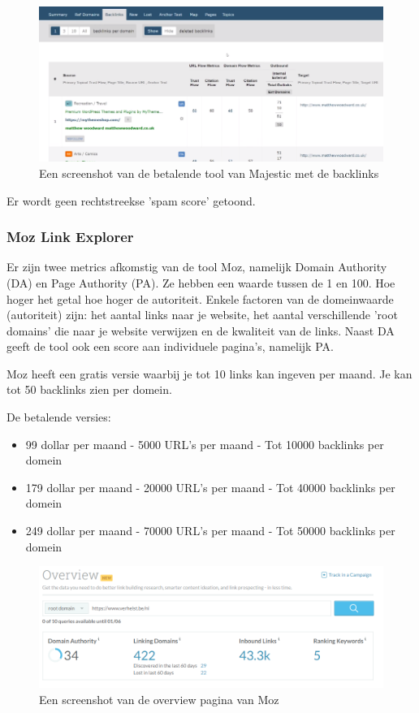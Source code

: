 \begin{figure}[h!]
\centering
\includegraphics[width=\linewidth]{img/majesticbacklink.PNG}
\caption{Een screenshot van de betalende tool van Majestic met de backlinks
\autocite{majestic}}
\end{figure}

Er wordt geen rechtstreekse 'spam score' getoond. 

\subsubsection{Moz Link Explorer}
\label{ch: Moz Link Explorer}

Er zijn twee metrics afkomstig van de tool Moz, namelijk Domain Authority (DA) en Page Authority (PA). Ze hebben een waarde tussen de 1 en 100. Hoe hoger het getal hoe hoger de autoriteit. Enkele factoren van de domeinwaarde (autoriteit) zijn: het aantal links naar je website, het aantal verschillende 'root domains' die naar je website verwijzen en de kwaliteit van de links. Naast DA geeft de tool ook een score aan individuele pagina's, namelijk PA. 

Moz heeft een gratis versie waarbij je tot 10 links kan ingeven per maand. Je kan tot 50 backlinks zien per domein. 

De betalende versies: 
\begin{itemize}
\item 99 dollar per maand - 5000 URL's per maand - Tot 10000 backlinks per domein
\item 179 dollar per maand - 20000 URL's per maand - Tot 40000 backlinks per domein
\item 249 dollar per maand - 70000 URL's per maand - Tot 50000 backlinks per domein
\end{itemize}

\begin{figure}[h!]
\centering
\includegraphics[width=\linewidth]{img/mozbacklink.PNG}
\caption{Een screenshot van de overview pagina van Moz
\autocite{moz}}
\end{figure}

